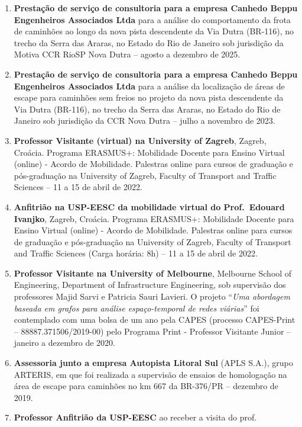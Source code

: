 \documentclass[
  brazilian,
  11pt,
  a4paper,
]{article}
\begin{document}
\begin{enumerate}
\def\labelenumi{\arabic{enumi}.}
\item
  \textbf{Prestação de serviço de consultoria para a empresa Canhedo
  Beppu Engenheiros Associados Ltda} para a análise do comportamento da
  frota de caminhões ao longo da nova pista descendente da Via Dutra
  (BR-116), no trecho da Serra das Araras, no Estado do Rio de Janeiro
  sob jurisdição da Motiva CCR RioSP Nova Dutra -- agosto a dezembro de
  2025.
\item
  \textbf{Prestação de serviço de consultoria para a empresa Canhedo
  Beppu Engenheiros Associados Ltda} para a análise da localização de
  áreas de escape para caminhões sem freios no projeto da nova pista
  descendente da Via Dutra (BR-116), no trecho da Serra das Araras, no
  Estado do Rio de Janeiro sob jurisdição da CCR Nova Dutra -- julho a
  novembro de 2023.
\item
  \textbf{Professor Visitante (virtual) na University of Zagreb},
  Zagreb, Croácia. Programa ERASMUS+: Mobilidade Docente para Ensino
  Virtual (online) - Acordo de Mobilidade. Palestras online para cursos
  de graduação e pós-graduação na University of Zagreb, Faculty of
  Transport and Traffic Sciences -- 11 a 15 de abril de 2022.
\item
  \textbf{Anfitrião na USP-EESC da mobilidade virtual do Prof.~Edouard
  Ivanjko}, Zagreb, Croácia. Programa ERASMUS+: Mobilidade Docente para
  Ensino Virtual (online) - Acordo de Mobilidade. Palestras online para
  cursos de graduação e pós-graduação na University of Zagreb, Faculty
  of Transport and Traffic Sciences (Carga horária: 8h) -- 11 a 15 de
  abril de 2022.
\item
  \textbf{Professor Visitante na University of Melbourne}, Melbourne
  School of Engineering, Department of Infrastructure Engineering, sob
  supervisão dos professores Majid Sarvi e Patricia Sauri Lavieri. O
  projeto ``\emph{Uma abordagem baseada em grafos para análise
  espaço-temporal de redes viárias}'' foi contemplado com uma bolsa de
  um ano pela CAPES (processo CAPES-Print -- 88887.371506/2019-00) pelo
  Programa Print - Professor Visitante Junior -- janeiro a dezembro de
  2020.
\item
  \textbf{Assessoria junto a empresa Autopista Litoral Sul} (APLS S.A.),
  grupo ARTERIS, em que foi realizada a supervisão de ensaios de
  homologação na área de escape para caminhões no km 667 da BR-376/PR --
  dezembro de 2019.
\item
  \textbf{Professor Anfitrião da USP-EESC} ao receber a visita do prof.

\end{enumerate}
\end{document}
